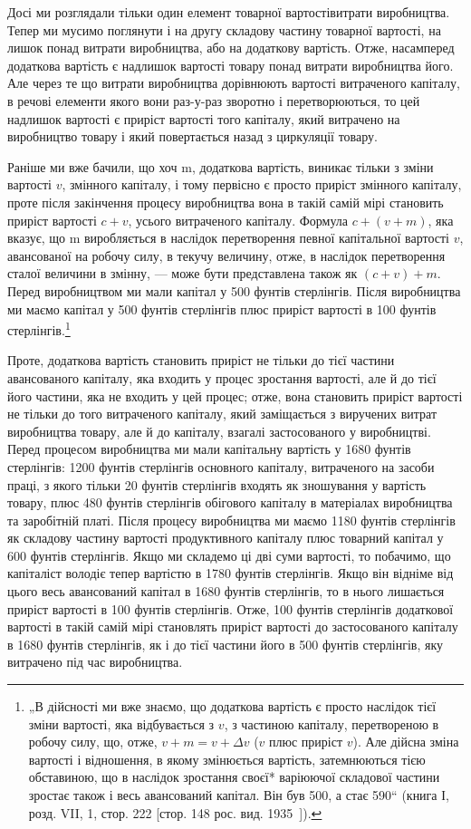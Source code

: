 Досі ми розглядали тільки один елемент товарної вартостівитрати
виробництва. Тепер ми мусимо поглянути і на другу
складову частину товарної вартості, на лишок понад витрати
виробництва, або на додаткову вартість. Отже, насамперед додаткова
вартість є надлишок вартості товару понад витрати виробництва
його. Але через те що витрати виробництва дорівнюють
вартості витраченого капіталу, в речові елементи якого вони
раз-у-раз зворотно і перетворюються, то цей надлишок вартості
є приріст вартості того капіталу, який витрачено на виробництво
товару і який повертається назад з циркуляції товару.

Раніше ми вже бачили, що хоч m, додаткова вартість, виникає
тільки з зміни вартості $v$, змінного капіталу, і тому первісно
є просто приріст змінного капіталу, проте після закінчення
процесу виробництва вона в такій самій мірі становить
приріст вартості $c + v$, усього витраченого капіталу. Формула
$c + (v + m)$, яка вказує, що m виробляється в наслідок перетворення
певної капітальної вартості $v$, авансованої на робочу силу,
в текучу величину, отже, в наслідок перетворення сталої величини
в змінну, — може бути представлена також як $(c + v) + m$.
Перед виробництвом ми мали капітал у 500 фунтів стерлінгів.
Після виробництва ми маємо капітал у 500 фунтів стерлінгів
плюс приріст вартості в 100 фунтів стерлінгів.\footnote{
„В дійсності ми вже знаємо, що додаткова вартість є просто наслідок
тієї зміни вартості, яка відбувається з $v$, з частиною капіталу, перетвореною
в робочу силу, що, отже, $v + m = v + Δv$ ($v$ плюс приріст $v$). Але дійсна зміна
вартості і відношення, в якому змінюється вартість, затемнюються тією обставиною,
що в наслідок зростання своєї* варіюючої складової частини зростає
також і весь авансований капітал. Він був 500, а стає 590“ (книга І, розд.
VII, 1, стор. 222 [стор. 148 рос. вид. 1935~]).
}

Проте, додаткова вартість становить приріст не тільки до
тієї частини авансованого капіталу, яка входить у процес зростання
вартості, але й до тієї його частини, яка не входить у цей
процес; отже, вона становить приріст вартості не тільки до того
витраченого капіталу, який заміщається з виручених витрат виробництва
товару, але й до капіталу, взагалі застосованого у виробництві.
Перед процесом виробництва ми мали капітальну
вартість у 1680 фунтів стерлінгів: 1200 фунтів стерлінгів основного
капіталу, витраченого на засоби праці, з якого тільки
20 фунтів стерлінгів входять як зношування у вартість товару,
плюс 480 фунтів стерлінгів обігового капіталу в матеріалах виробництва
та заробітній платі. Після процесу виробництва ми
маємо 1180 фунтів стерлінгів як складову частину вартості
продуктивного капіталу плюс товарний капітал у 600 фунтів
стерлінгів. Якщо ми складемо ці дві суми вартості, то побачимо,
що капіталіст володіє тепер вартістю в 1780 фунтів стерлінгів.
Якщо він відніме від цього весь авансований капітал в 1680
фунтів стерлінгів, то в нього лишається приріст вартості в 100
фунтів стерлінгів. Отже, 100 фунтів стерлінгів додаткової вартості
в такій самій мірі становлять приріст вартості до застосованого
капіталу в 1680 фунтів стерлінгів, як і до тієї частини
його в 500 фунтів стерлінгів, яку витрачено під час виробництва.
